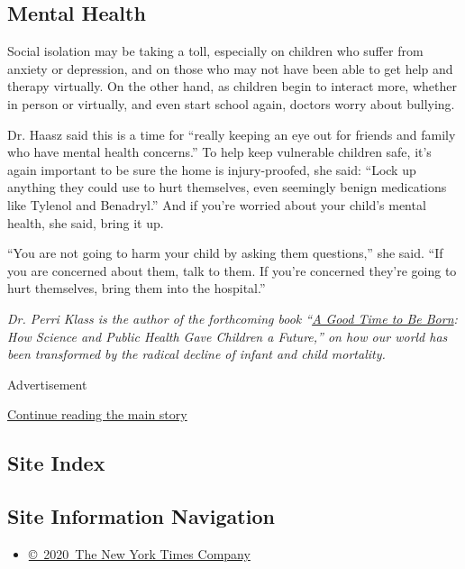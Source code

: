 \hypertarget{mental-health}{%
\subsection{Mental Health}\label{mental-health}}

Social isolation may be taking a toll, especially on children who suffer
from anxiety or depression, and on those who may not have been able to
get help and therapy virtually. On the other hand, as children begin to
interact more, whether in person or virtually, and even start school
again, doctors worry about bullying.

Dr. Haasz said this is a time for ``really keeping an eye out for
friends and family who have mental health concerns.'' To help keep
vulnerable children safe, it's again important to be sure the home is
injury-proofed, she said: ``Lock up anything they could use to hurt
themselves, even seemingly benign medications like Tylenol and
Benadryl.'' And if you're worried about your child's mental health, she
said, bring it up.

``You are not going to harm your child by asking them questions,'' she
said. ``If you are concerned about them, talk to them. If you're
concerned they're going to hurt themselves, bring them into the
hospital.''

\emph{Dr. Perri Klass is the author of the forthcoming book
``}\href{https://www.amazon.com/Good-Time-Be-Born-Children/dp/0393609995/ref=tmm_hrd_swatch_0?_encoding=UTF8\&qid=\&sr=}{\emph{A
Good Time to Be Born}}\emph{: How Science and Public Health Gave
Children a Future,'' on how our world has been transformed by the
radical decline of infant and child mortality.}

Advertisement

\protect\hyperlink{after-bottom}{Continue reading the main story}

\hypertarget{site-index}{%
\subsection{Site Index}\label{site-index}}

\hypertarget{site-information-navigation}{%
\subsection{Site Information
Navigation}\label{site-information-navigation}}

\begin{itemize}
\tightlist
\item
  \href{https://help.nytimes3xbfgragh.onion/hc/en-us/articles/115014792127-Copyright-notice}{©~2020~The
  New York Times Company}
\end{itemize}

